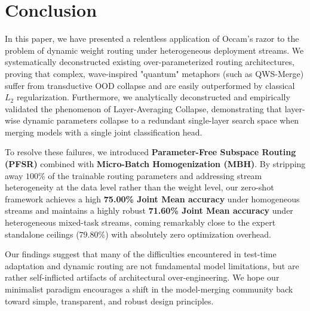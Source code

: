 \section{Conclusion}
\label{sec:conclusion}

In this paper, we have presented a relentless application of Occam's razor to the problem of dynamic weight routing under heterogeneous deployment streams. We systematically deconstructed existing over-parameterized routing architectures, proving that complex, wave-inspired "quantum" metaphors (such as QWS-Merge) suffer from transductive OOD collapse and are easily outperformed by classical $L_2$ regularization. Furthermore, we analytically deconstructed and empirically validated the phenomenon of Layer-Averaging Collapse, demonstrating that layer-wise dynamic parameters collapse to a redundant single-layer search space when merging models with a single joint classification head.

To resolve these failures, we introduced \textbf{Parameter-Free Subspace Routing (PFSR)} combined with \textbf{Micro-Batch Homogenization (MBH)}. By stripping away $100\%$ of the trainable routing parameters and addressing stream heterogeneity at the data level rather than the weight level, our zero-shot framework achieves a high \textbf{75.00\% Joint Mean accuracy} under homogeneous streams and maintains a highly robust \textbf{71.60\% Joint Mean accuracy} under heterogeneous mixed-task streams, coming remarkably close to the expert standalone ceilings ($79.80\%$) with absolutely zero optimization overhead. 

Our findings suggest that many of the difficulties encountered in test-time adaptation and dynamic routing are not fundamental model limitations, but are rather self-inflicted artifacts of architectural over-engineering. We hope our minimalist paradigm encourages a shift in the model-merging community back toward simple, transparent, and robust design principles.
